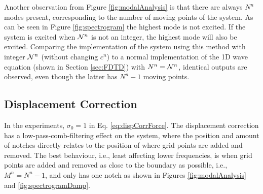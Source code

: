 Another observation from Figure \ref{fig:modalAnalysis} is that there are always $N^n$ modes present, corresponding to the number of moving points of the system. As can be seen in Figure \ref{fig:spectrogram} the highest mode is not excited. If the system is excited when $\mathcal{N}^n$ is not an integer, the highest mode will also be excited.
Comparing the implementation of the system using this method with integer $\mathcal{N}^n$ (without changing $c^n$) to a normal implementation of the 1D wave equation (shown in Section \ref{sec:FDTD}) with $N^n = \mathcal{N}^n$, identical outputs are observed, even though the latter has $N^n-1$ moving points.


\subsection{Displacement Correction}\label{sec:dispCorrRes}
In the experiments, $\sigma_0 = 1$ in Eq. \eqref{eq:dispCorrForce}. The displacement correction has a low-pass-comb-filtering effect on the system, where the position and amount of notches directly relates to the position of where grid points are added and removed. The best behaviour, i.e., least affecting lower frequencies, is when grid points are added and removed as close to the boundary as possible, i.e., $M^n = N^n - 1$, and only has one notch as shown in Figures \ref{fig:modalAnalysis} and \ref{fig:spectrogramDamp}.



